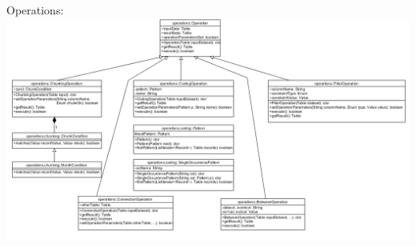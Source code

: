 \documentclass[11pt,twoside,a4paper]{article}
\begin{document}
Operations:\\
\includegraphics[scale=0.8, center]{Operations_diagram.PNG}
\end{document}

